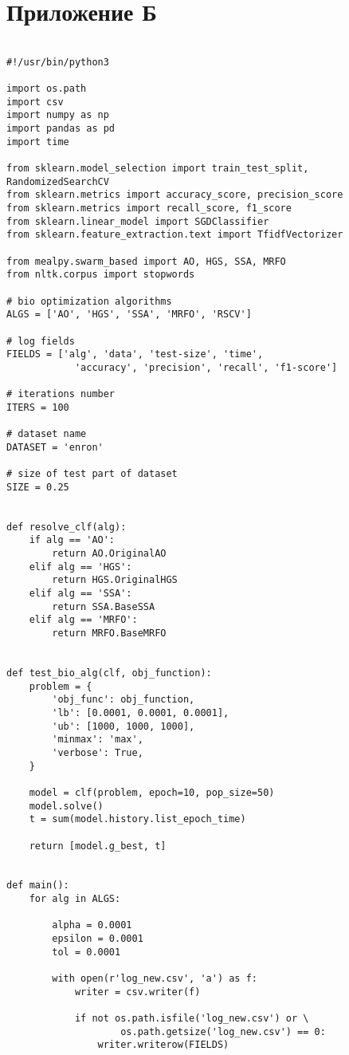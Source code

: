 \chapter*{Приложение Б}\label{App2}

\begin{lstlisting}

#!/usr/bin/python3

import os.path
import csv
import numpy as np
import pandas as pd
import time

from sklearn.model_selection import train_test_split, RandomizedSearchCV
from sklearn.metrics import accuracy_score, precision_score
from sklearn.metrics import recall_score, f1_score
from sklearn.linear_model import SGDClassifier
from sklearn.feature_extraction.text import TfidfVectorizer

from mealpy.swarm_based import AO, HGS, SSA, MRFO
from nltk.corpus import stopwords

# bio optimization algorithms
ALGS = ['AO', 'HGS', 'SSA', 'MRFO', 'RSCV']

# log fields
FIELDS = ['alg', 'data', 'test-size', 'time',
            'accuracy', 'precision', 'recall', 'f1-score']

# iterations number
ITERS = 100

# dataset name
DATASET = 'enron'

# size of test part of dataset
SIZE = 0.25


def resolve_clf(alg):
    if alg == 'AO':
        return AO.OriginalAO
    elif alg == 'HGS':
        return HGS.OriginalHGS
    elif alg == 'SSA':
        return SSA.BaseSSA
    elif alg == 'MRFO':
        return MRFO.BaseMRFO


def test_bio_alg(clf, obj_function):
    problem = {
        'obj_func': obj_function,
        'lb': [0.0001, 0.0001, 0.0001],
        'ub': [1000, 1000, 1000],
        'minmax': 'max',
        'verbose': True,
    }

    model = clf(problem, epoch=10, pop_size=50)
    model.solve()
    t = sum(model.history.list_epoch_time)

    return [model.g_best, t]


def main():
    for alg in ALGS:

        alpha = 0.0001
        epsilon = 0.0001
        tol = 0.0001

        with open(r'log_new.csv', 'a') as f:
            writer = csv.writer(f)

            if not os.path.isfile('log_new.csv') or \
                    os.path.getsize('log_new.csv') == 0:
                writer.writerow(FIELDS)


\end{lstlisting}
